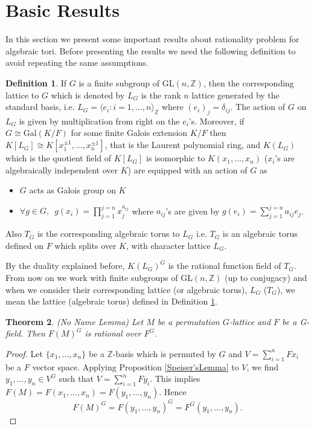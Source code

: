 \documentclass{article}
\theoremstyle{plain}
\newtheorem{theorem}{Theorem}
\theoremstyle{definition}
\newtheorem{definition}[theorem]{Definition}
\newcommand{\Z}{\ensuremath{\mathbb{Z}}}
\newcommand{\G}{G}
\newcommand{\glat}{$G$-lattice}
\begin{document}
\section{Basic Results}
In this section we present some important results about rationality problem for 
algebraic tori. Before presenting the results we need the following definition 
to avoid repeating the same assumptions.
\begin{definition}\label{Assumption}
If $G$ is a finite subgroup of $\mathrm{GL}(n,\Z)$, then the corresponding lattice 
to $G$ which is denoted by $L_G$ is the rank $n$ lattice generated by the standard 
basis, i.e. $L_G = \langle e_i : i  = 1, \ldots, n \rangle_\Z$ where $(e_i)_j = \delta_{ij}$. 
The action of $G$ on $L_G$ is given by multiplication from right on the $e_i$'s.
 Moreover, if $G \cong \mathrm{Gal}(K/F)$ for some finite Galois extension $K/F$ 
 then $K[L_G] \cong K[x^{\pm 1}_1, \ldots , x^{\pm 1}_n]$, that is the Laurent 
 polynomial ring, and $K(L_G)$ which is the quotient field of $K[L_G]$ is isomorphic 
 to $K(x_1, \ldots , x_n)$ ($x_i$'s are algebraically independent over $K$) are equipped 
 with an action of $G$ as
\begin{itemize}
\item $G$ acts as Galois group on $K$ 
\item $\forall g \in G, \,\,\, g(x_i) = \prod_{j=1}^{j=n} x_j^{a_{ij}}$  where $a_{ij}$'s 
are given by $g(e_i) = \sum_{j=1}^{j=n} a_{ij}e_j$.
\end{itemize}
Also $T_G$ is the corresponding algebraic torus to $L_G$ i.e. $T_G$ is an algebraic 
torus defined on $F$ which splits over $K$, with character lattice $L_G$. 
\end{definition}
\noindent
By the duality explained before, $K(L_G)^G$ is the rational function field of $T_G$. 
From now on we work with finite subgroups of $\mathrm{GL}(n,\Z)$ (up to conjugacy) and 
when we consider their corresponding lattice (or algebraic torus), $L_G$ ($T_G$), we 
mean the lattice (algebraic torus) defined in Definition \ref{Assumption}. 
\label{action}
\begin{theorem}\cite{Speiser}\label{NoNameLemma}
(No Name Lemma) Let $M$ be a permutation \glat \,\,and $F$ be a \G-field. Then $F(M)^\G$ 
is rational over $F^\G$. 
\end{theorem}
\begin{proof}
Let $\lbrace x_1, \ldots , x_n \rbrace$ be a $\Z$-basis which is permuted by $G$ and 
$V = \sum^n_{i=1}Fx_i$ be a $F$ vector space. Applying Proposition \ref{Speiser'sLemma} 
to $V$, we find $y_1, \ldots , y_n \in V^G $ such that $V = \sum^n_{i=1}Fy_i$. This 
implies $F(M) = F(x_1, \ldots, x_n) = F(y_1, \ldots, y_n)$. Hence 
$$F(M)^G = F(y_1, \ldots , y_n)^G = F^G(y_1, \dots, y_n).$$ 
\end{proof}
\end{document}
